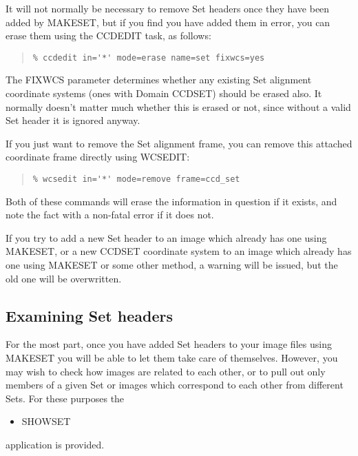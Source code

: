 \documentclass[twoside,11pt]{article}
\newcommand{\htmlref}[2]{#1}
\newcommand{\latexhtml}[2]{#1}
\newcommand{\xlabel}[1]{}
\renewcommand{\_}{\texttt{\symbol{95}}}
\newcommand{\ttsize}{\latexhtml{\small}{}}
\newenvironment{myquote}{\begin{quote}\ttsize}{\end{quote}}
\newcommand{\routine}[1]{{\sc #1}}
\newcommand{\xroutine}[1]{\htmlref{{\sc #1}}{#1}}
\begin{document}
It will not normally be necessary to remove Set headers once they
have been added by \xroutine{MAKESET}, but if you find you have
added them in error, you can erase them using the \xroutine{CCDEDIT}
task, as follows:
\begin{myquote}
\begin{verbatim}
% ccdedit in='*' mode=erase name=set fixwcs=yes
\end{verbatim}
\end{myquote}
The FIXWCS parameter determines whether any existing Set alignment
coordinate systems (ones with Domain CCD\_SET) should be erased also.
It normally doesn't matter much whether this is erased or not,
since without a valid Set header it is ignored anyway.

If you just want to remove the Set alignment frame, you can 
remove this attached coordinate frame directly using \xroutine{WCSEDIT}:
\begin{myquote}
\begin{verbatim}
% wcsedit in='*' mode=remove frame=ccd_set
\end{verbatim}
\end{myquote}

Both of these commands will erase the information in question if
it exists, and note the fact with a non-fatal error if it does not.

If you try to add a new Set header to
an image which already has one using \routine{MAKESET}, 
or a new CCD\_SET coordinate system to an image which already has one
using \routine{MAKESET} or some other method,
a warning will be issued, but
the old one will be overwritten.

\subsection{\xlabel{showsethead}\label{showsethead}Examining Set headers}

For the most part, once you have added Set headers to your image
files using \routine{MAKESET} you will be able to let them 
take care of themselves.
However, you may wish to check how images are related to each other,
or to pull out only members of a given Set or images which correspond
to each other from different Sets.
For these purposes the
\begin{itemize}
\item \xroutine{SHOWSET}
\end{itemize}
application is provided.
\end{document}
